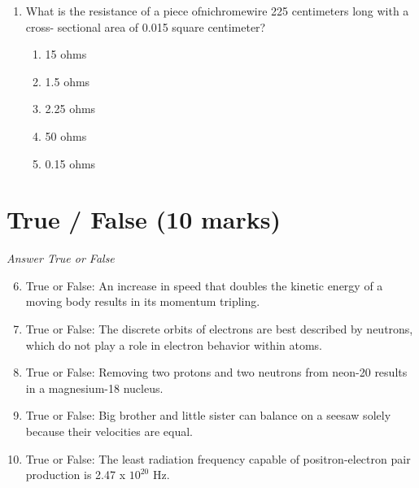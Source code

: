 \documentclass[12pt]{article}
\begin{document}
\begin{enumerate}[label=\arabic*.]
\begin{enumerate}[label=(\alph*)]
    \item It will quadruple.
    \item It will increase by a factor of 2.
    \item It will become zero.
    \item It will be halved.
    \item It will double.
\end{enumerate}
\item What is the resistance of a piece ofnichromewire 225 centimeters long with a cross- sectional area of 0.015 square centimeter?
\begin{enumerate}[label=(\alph*)]
    \item 15 ohms
    \item 1.5 ohms
    \item 2.25 ohms
    \item 50 ohms
    \item 0.15 ohms
\end{enumerate}
\end{enumerate}

\section*{True / False (10 marks)}
\textit{Answer True or False}
\begin{enumerate}[label=\arabic*.]
\setcounter{enumi}{5}
\item True or False: An increase in speed that doubles the kinetic energy of a moving body results in its momentum tripling.
\item True or False: The discrete orbits of electrons are best described by neutrons, which do not play a role in electron behavior within atoms.
\item True or False: Removing two protons and two neutrons from neon-20 results in a magnesium-18 nucleus.
\item True or False: Big brother and little sister can balance on a seesaw solely because their velocities are equal.
\item True or False: The least radiation frequency capable of positron-electron pair production is 2.47 x $10^20$ Hz.
\end{enumerate}
\end{document}
